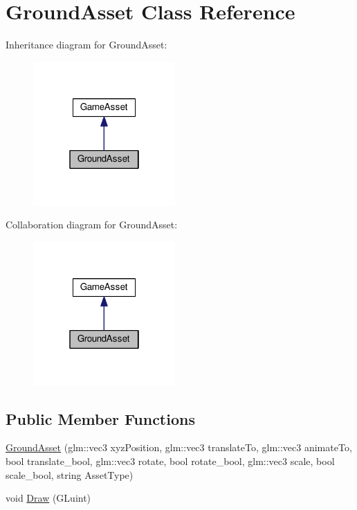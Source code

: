 \hypertarget{class_ground_asset}{}\section{Ground\+Asset Class Reference}
\label{class_ground_asset}


Inheritance diagram for Ground\+Asset\+:
\nopagebreak
\begin{figure}[H]
\begin{center}
\leavevmode
\includegraphics[width=154pt]{class_ground_asset__inherit__graph}
\end{center}
\end{figure}


Collaboration diagram for Ground\+Asset\+:
\nopagebreak
\begin{figure}[H]
\begin{center}
\leavevmode
\includegraphics[width=154pt]{class_ground_asset__coll__graph}
\end{center}
\end{figure}
\subsection*{Public Member Functions}
\begin{DoxyCompactItemize}
\item 
\hyperlink{class_ground_asset_a67002eb5df923fab9293c5f43ed140a4}{Ground\+Asset} (glm\+::vec3 xyz\+Position, glm\+::vec3 translate\+To, glm\+::vec3 animate\+To, bool translate\+\_\+bool, glm\+::vec3 rotate, bool rotate\+\_\+bool, glm\+::vec3 scale, bool scale\+\_\+bool, string Asset\+Type)
\item 
void \hyperlink{class_ground_asset_a440f983638c7a7ccb6a39718444dfe95}{Draw} (G\+Luint)
\end{DoxyCompactItemize}


